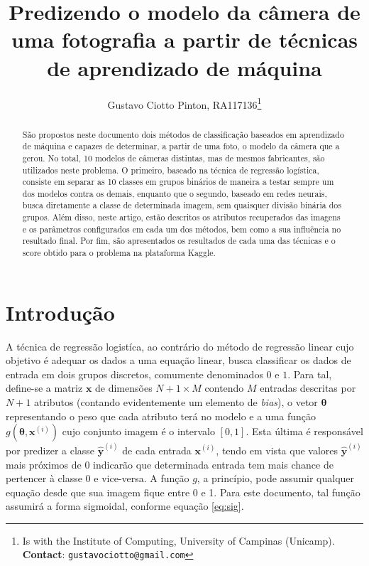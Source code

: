 \documentclass[10pt,twocolumn,letterpaper]{article}
\begin{document}
\title {Predizendo o modelo da câmera de uma fotografia a partir de técnicas de aprendizado de máquina}
\author{Gustavo Ciotto Pinton, RA117136\thanks{Is with the Institute of Computing, University of Campinas (Unicamp). \textbf{Contact}: \tt\small{gustavociotto@gmail.com}}}

\maketitle
\begin{abstract}
São propostos neste documento dois métodos de classificação baseados em aprendizado de máquina e capazes de determinar, a partir de uma foto, o modelo da câmera que a gerou. No total, 10 modelos de câmeras distintas, mas de mesmos fabricantes, são utilizados neste problema. O primeiro, baseado na técnica de regressão logística, consiste em separar as 10 classes em grupos binários de maneira a testar sempre um dos modelos contra os demais, enquanto que o segundo, baseado em redes neurais, busca diretamente a classe de determinada imagem, sem quaisquer divisão binária dos grupos. Além disso, neste artigo, estão descritos os atributos recuperados das imagens e os parâmetros configurados em cada um dos métodos, bem como a sua influência no resultado final. Por fim, são apresentados os resultados de cada uma das técnicas e o score obtido para o problema na plataforma Kaggle.
\end{abstract}

\section{Introdução}
\label{intro}

A técnica de regressão logistíca, ao contrário do método de regressão linear cujo objetivo é adequar os dados a uma equação linear, busca classificar os dados de entrada em dois grupos discretos, comumente denominados \(0\) e \(1\). Para tal, define-se a matriz \(\bm{x}\) de dimensões \(N + 1 \times M\)  contendo \(M\) entradas descritas por \(N + 1\) atributos (contando evidentemente um elemento de \textit{bias}), o vetor \(\bm{\theta}\) representando o peso que cada atributo terá no modelo e a uma função \(g\left(\bm{\theta}, \bm{x}^{(i)}\right)\) cujo conjunto imagem é o intervalo \([0,1]\). Esta última é responsável por predizer a classe \(\bm{\hat{y}}^{(i)}\) de cada entrada \(\bm{x}^{(i)}\), tendo em vista que valores \(\bm{\hat{y}}^{(i)}\) mais próximos de 0 indicarão que determinada entrada tem mais chance de pertencer à classe 0 e vice-versa. A função \(g\), a princípio, pode assumir qualquer equação desde que sua imagem fique entre 0 e 1. Para este documento, tal função assumirá a forma sigmoidal, conforme equação \ref{eq:sig}.
\end{document}

